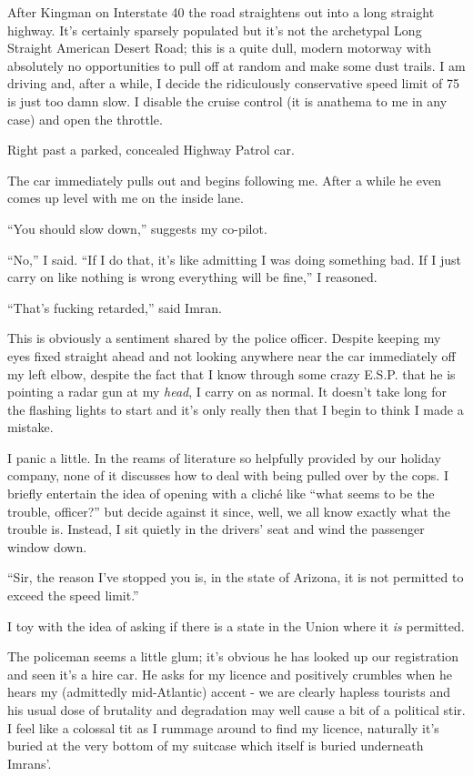 \documentclass[a5paper,titlepage,11pt,draft]{book}
\begin{document}
After Kingman on Interstate 40 the road straightens out into a long straight highway.  It's certainly sparsely populated but it's not the archetypal Long Straight American Desert Road; this is a quite dull, modern motorway with absolutely no opportunities to pull off at random and make some dust trails.  I am driving and, after a while, I decide the ridiculously conservative speed limit of 75 is just too damn slow.  I disable the cruise control (it is anathema to me in any case) and open the throttle.

Right past a parked, concealed Highway Patrol car.

The car immediately pulls out and begins following me.  After a while he even comes up level with me on the inside lane.

``You should slow down,'' suggests my co-pilot.

``No,'' I said.  ``If I do that, it's like admitting I was doing something bad.  If I just carry on like nothing is wrong everything will be fine,'' I reasoned.

``That's fucking retarded,'' said Imran.

This is obviously a sentiment shared by the police officer.  Despite keeping my eyes fixed straight ahead and not looking anywhere near the car immediately off my left elbow, despite the fact that I know through some crazy E.S.P. that he is pointing a radar gun at my \emph{head}, I carry on as normal.  It doesn't take long for the flashing lights to start and it's only really then that I begin to think I made a mistake.

I panic a little.  In the reams of literature so helpfully provided by our holiday company, none of it discusses how to deal with being pulled over by the cops.  I briefly entertain the idea of opening with a clich\'{e} like ``what seems to be the trouble, officer?'' but decide against it since, well, we all know exactly what the trouble is.  Instead, I sit quietly in the drivers' seat and wind the passenger window down.

``Sir, the reason I've stopped you is, in the state of Arizona, it is not permitted to exceed the speed limit.''

I toy with the idea of asking if there is a state in the Union where it \emph{is} permitted.

The policeman seems a little glum; it's obvious he has looked up our registration and seen it's a hire car.  He asks for my licence and positively crumbles when he hears my (admittedly mid-Atlantic) accent - we are clearly hapless tourists and his usual dose of brutality and degradation may well cause a bit of a political stir.  I feel like a colossal tit as I rummage around to find my licence, naturally it's buried at the very bottom of my suitcase which itself is buried underneath Imrans'.
\end{document}
